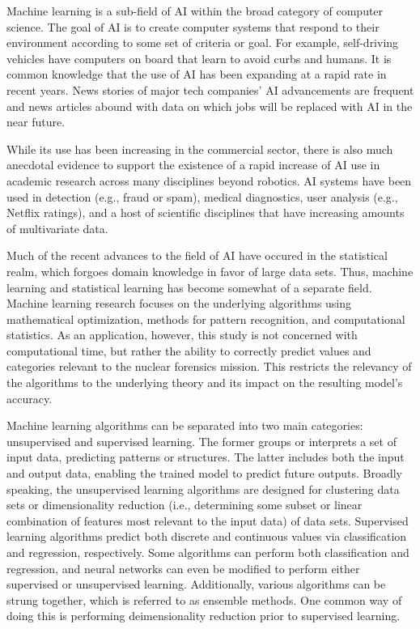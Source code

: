 Machine learning is a sub-field of \gls{AI} within the broad category of
computer science. The goal of \gls{AI} is to create computer systems that
respond to their environment according to some set of criteria or goal. For
example, self-driving vehicles have computers on board that learn to avoid
curbs and humans. It is common knowledge that the use of \gls{AI} has been
expanding at a rapid rate in recent years. News stories of major tech
companies' \gls{AI} advancements are frequent and news articles abound with
data on which jobs will be replaced with \gls{AI} in the near future. 

While its use has been increasing in the commercial sector, there is also much
anecdotal evidence to support the existence of a rapid increase of \gls{AI} use
in academic research across many disciplines beyond robotics. \gls{AI} systems
have been used in detection (e.g., fraud or spam), medical diagnostics, user
analysis (e.g., Netflix ratings), and a host of scientific disciplines that
have increasing amounts of multivariate data.

Much of the recent advances to the field of \gls{AI} have occured in the
statistical realm, which forgoes domain knowledge in favor of large data sets.
Thus, machine learning and statistical learning has become somewhat of a
separate field.  Machine
learning research focuses on the underlying algorithms using mathematical
optimization, methods for pattern recognition, and computational statistics.
As an application, however, this study is not concerned with computational
time, but rather the ability to correctly predict values and categories
relevant to the nuclear forensics mission. This restricts the relevancy of the
algorithms to the underlying theory and its impact on the resulting model's
accuracy. 

Machine learning algorithms can be separated into two main categories:
unsupervised and supervised learning.  The former groups or interprets a set of
input data, predicting patterns or structures. The latter includes both the
input and output data, enabling the trained model to predict future outputs.
Broadly speaking, the unsupervised learning algorithms are designed for
clustering data sets or dimensionality reduction (i.e., determining some subset
or linear combination of features most relevant to the input data) of data
sets.  Supervised learning algorithms predict both discrete and continuous
values via classification and regression, respectively. Some algorithms can
perform both classification and regression, and neural networks can even be
modified to perform either supervised or unsupervised learning. Additionally,
various algorithms can be strung together, which is referred to as ensemble
methods. One common way of doing this is performing deimensionality reduction
prior to supervised learning. 

